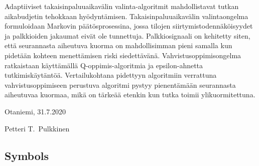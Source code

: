 \documentclass[english, 12pt, a4paper, elec, utf8, a-1b, online]{aaltothesis}
\begin{document}
\begin{abstractpage}[finnish]
Adaptiiviset takaisinpaluuaikavälin valinta-algoritmit mahdollistavat tutkan aikabudjetin tehokkaan hyödyntämisen. Takaisinpaluuaikavälin valintaongelma formuloidaan Markovin päätösprosessina, jossa tilojen siirtymistodennäköisyydet ja palkkioiden jakaumat eivät ole tunnettuja. Palkkiosignaali on kehitetty siten, että seurannasta aiheutuva kuorma on mahdollisimman pieni samalla kun pidetään kohteen menettämisen riski siedettävänä. Vahvistusoppimisongelma ratkaistaan käyttämällä Q-oppimis-algoritmia ja epsilon-ahnetta tutkimiskäytäntöä. Vertailukohtana pidettyyn algoritmiin verrattuna vahvistusoppimiseen perustuva algoritmi pystyy pienentämään seurannasta aiheutuvaa kuormaa, mikä on tärkeää etenkin kun tutka toimii ylikuormitettuna.
\end{abstractpage}

\newpage


\vspace{5cm}
Otaniemi, 31.7.2020

\vspace{5mm}
{\hfill Petteri T.\ Pulkkinen \hspace{1cm}}

\newpage

\thesistableofcontents



\subsection*{Symbols}
\end{document}
